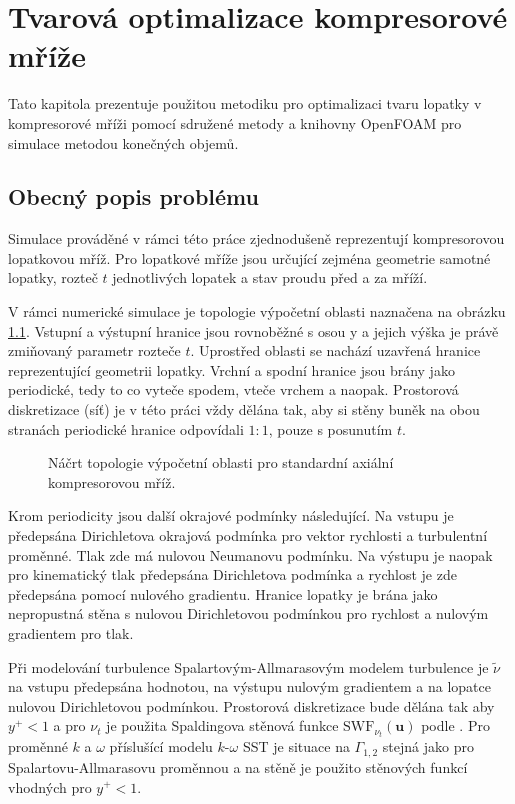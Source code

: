 
\chapter{Tvarová optimalizace kompresorové mříže}

Tato kapitola prezentuje použitou metodiku pro optimalizaci tvaru lopatky v kompresorové mříži pomocí sdružené metody a knihovny OpenFOAM pro simulace metodou konečných objemů.

\section{Obecný popis problému}

Simulace prováděné v rámci této práce zjednodušeně reprezentují kompresorovou lopatkovou mříž. Pro lopatkové mříže jsou určující zejména geometrie samotné lopatky, rozteč $ t $ jednotlivých lopatek a stav proudu před a za mříží.

V rámci numerické simulace je topologie výpočetní oblasti naznačena na obrázku \ref{fig:vypocetni_oblast}. Vstupní a výstupní hranice jsou rovnoběžné s osou y a jejich výška je právě zmiňovaný parametr rozteče $ t $. Uprostřed oblasti se nachází uzavřená hranice reprezentující geometrii lopatky. Vrchní a spodní hranice jsou brány jako periodické, tedy to co vyteče spodem, vteče vrchem a naopak. Prostorová diskretizace (síť) je v této práci vždy dělána tak, aby si stěny buněk na obou stranách periodické hranice odpovídali $ 1:1 $, pouze s posunutím $ t $.

\begin{figure}
	\def\svgwidth{0.85\textwidth}
	\graphicspath{{img/inkscape/}}
	
	\caption[Topologie výpočetní oblasti]{Náčrt topologie výpočetní oblasti pro standardní axiální kompresorovou mříž.}
	\label{fig:vypocetni_oblast}
\end{figure}

Krom periodicity jsou další okrajové podmínky následující. Na vstupu je předepsána Dirichletova okrajová podmínka pro vektor rychlosti a turbulentní proměnné. Tlak zde má nulovou Neumanovu podmínku. Na výstupu je naopak pro kinematický tlak předepsána Dirichletova podmínka a rychlost je zde předepsána pomocí nulového gradientu. Hranice lopatky je brána jako nepropustná stěna s nulovou Dirichletovou podmínkou pro rychlost a nulovým gradientem pro tlak.

Při modelování turbulence Spalartovým-Allmarasovým modelem turbulence je $ \tilde{\nu} $ na vstupu předepsána hodnotou, na výstupu nulovým gradientem a na lopatce nulovou Dirichletovou podmínkou. Prostorová diskretizace bude dělána tak aby $ y^+<1 $ a pro $ \nu_t $ je použita Spaldingova stěnová funkce $ \mathrm{SWF}_{\nu_t}(\mathbf{u}) $ podle \cite{spalding1961single}. Pro proměnné $ k $ a $ \omega $ příslušící modelu $ k\text{-}\omega $ SST je situace na $ \Gamma_{1,2} $ stejná jako pro Spalartovu-Allmarasovu proměnnou a na stěně je použito stěnových funkcí \cite{kalitzin2005near} vhodných pro $ y^+<1 $. 

